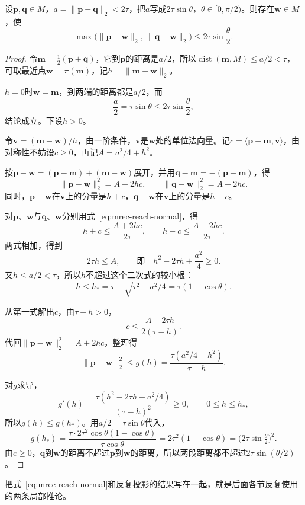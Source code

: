\begin{lemma}[中点投影]
\label{lem:mrec-midpoint}
设$\bm p,\bm q\in M$，$a=\lVert\bm p-\bm q\rVert_2<2\tau$，把$a$写成$2\tau\sin\theta$，$\theta\in[0,\pi/2)$。则存在$\bm w\in M$，使
\begin{equation}
 \max\bigl(\lVert\bm p-\bm w\rVert_2,\ \lVert\bm q-\bm w\rVert_2\bigr)\leq2\tau\sin\frac\theta2 .
 \label{eq:mrec-midpoint}
\end{equation}
\end{lemma}
\begin{proof}
令$\bm m=\tfrac12(\bm p+\bm q)$，它到$\bm p$的距离是$a/2$，所以$\operatorname{dist}(\bm m,M)\leq a/2<\tau$，可取最近点$\bm w=\pi(\bm m)$，记$h=\lVert\bm m-\bm w\rVert_2$。

$h=0$时$\bm w=\bm m$，到两端的距离都是$a/2$，而
\[
 \frac a2=\tau\sin\theta\leq2\tau\sin\frac\theta2 ,
\]
结论成立。下设$h>0$。

令$\bm v=(\bm m-\bm w)/h$，由一阶条件，$\bm v$是$\bm w$处的单位法向量。记$c=\langle\bm p-\bm m,\bm v\rangle$，由对称性不妨设$c\geq0$，再记$A=a^2/4+h^2$。

按$\bm p-\bm w=(\bm p-\bm m)+(\bm m-\bm w)$展开，并用$\bm q-\bm m=-(\bm p-\bm m)$，得
\[
 \lVert\bm p-\bm w\rVert_2^2=A+2hc,\qquad\lVert\bm q-\bm w\rVert_2^2=A-2hc .
\]
同时，$\bm p-\bm w$在$\bm v$上的分量是$h+c$，$\bm q-\bm w$在$\bm v$上的分量是$h-c$。

对$\bm p$、$\bm w$与$\bm q$、$\bm w$分别用式~\eqref{eq:mrec-reach-normal}，得
\[
 h+c\leq\frac{A+2hc}{2\tau},\qquad h-c\leq\frac{A-2hc}{2\tau}.
\]
两式相加，得到
\[
 2\tau h\leq A,\qquad\text{即}\quad h^2-2\tau h+\frac{a^2}4\geq0 .
\]
又$h\leq a/2<\tau$，所以$h$不超过这个二次式的较小根：
\[
 h\leq h_*=\tau-\sqrt{\tau^2-a^2/4}=\tau(1-\cos\theta).
\]

从第一式解出$c$，由$\tau-h>0$，
\[
 c\leq\frac{A-2\tau h}{2(\tau-h)}.
\]
代回$\lVert\bm p-\bm w\rVert_2^2=A+2hc$，整理得
\[
 \lVert\bm p-\bm w\rVert_2^2\leq g(h)=\frac{\tau(a^2/4-h^2)}{\tau-h}.
\]

对$g$求导，
\[
 g'(h)=\frac{\tau(h^2-2\tau h+a^2/4)}{(\tau-h)^2}\geq0,\qquad 0\leq h\leq h_*,
\]
所以$g(h)\leq g(h_*)$。用$a/2=\tau\sin\theta$代入，
\[
 g(h_*)=\frac{\tau\cdot2\tau^2\cos\theta(1-\cos\theta)}{\tau\cos\theta}=2\tau^2(1-\cos\theta)=\bigl(2\tau\sin\tfrac\theta2\bigr)^2 .
\]
由$c\geq0$，$\bm q$到$\bm w$的距离不超过$\bm p$到$\bm w$的距离，所以两段距离都不超过$2\tau\sin(\theta/2)$。
\end{proof}

把式~\eqref{eq:mrec-reach-normal}和反复投影的结果写在一起，就是后面各节反复使用的两条局部推论。

